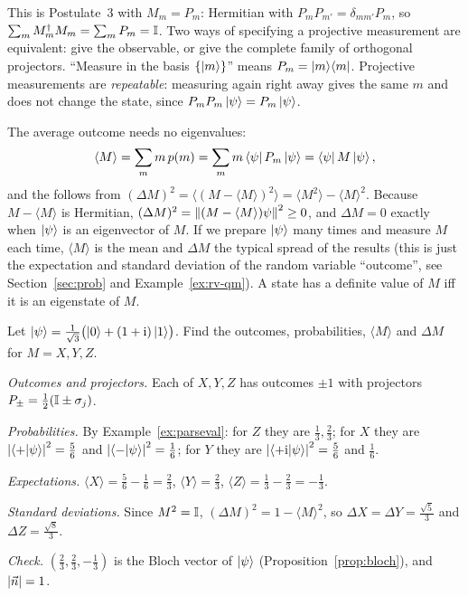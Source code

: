 This is Postulate~3 with $M_m=P_m$: Hermitian with $P_mP_{m'}=\delta_{mm'}P_m$, so $\sum_mM_m^\dagger M_m=\sum_mP_m=\mathbb{I}$. Two ways of specifying a projective measurement are equivalent: give the observable, or give the complete family of orthogonal projectors.
``Measure in the basis $\{\left|m\right\rangle\}$'' means $P_m=\left|m\right\rangle\!\left\langle m\right|$. Projective measurements are \emph{repeatable}: measuring again right away gives the same $m$ and does not change the state, since $P_mP_m\left|\psi\right\rangle=P_m\left|\psi\right\rangle$.

The average outcome needs no eigenvalues:
\[
  \langle M\rangle=\sum_mm\,p(m)=\sum_mm\left\langle\psi\right| P_m\left|\psi\right\rangle=\left\langle\psi\right| M\left|\psi\right\rangle,
\]
and the  follows from $(\Delta M)^2=\langle(M-\langle M\rangle)^2\rangle=\langle M^2\rangle-\langle M\rangle^2$. Because $M-\langle M\rangle$ is Hermitian, $(\Delta M)^2=\left\|(M-\langle M\rangle)\psi\right\|^2\ge0$, and $\Delta M=0$ exactly when $\left|\psi\right\rangle$ is an eigenvector of $M$.
If we prepare $\left|\psi\right\rangle$ many times and measure $M$ each time, $\langle M\rangle$ is the mean and $\Delta M$ the typical spread of the results (this is just the expectation and standard deviation of the random variable ``outcome'', see Section~\ref{sec:prob} and Example~\ref{ex:rv-qm}). A state has a definite value of $M$ iff it is an eigenstate of $M$.

\begin{example}\label{ex:meas-pauli}
  Let $\left|\psi\right\rangle=\frac1{\sqrt3}\bigl(\left|0\right\rangle+(1+\mathrm{i})\left|1\right\rangle\bigr)$. Find the outcomes, probabilities, $\langle M\rangle$ and $\Delta M$ for $M=X,Y,Z$.
\end{example}
\begin{solution}
  \begin{steps}
    \item \emph{Outcomes and projectors.} Each of $X,Y,Z$ has outcomes $\pm1$ with projectors $P_\pm=\tfrac12(\mathbb{I}\pm\sigma_j)$.
    \item \emph{Probabilities.} By Example~\ref{ex:parseval}: for $Z$ they are $\tfrac13,\tfrac23$; for $X$ they are $\left|\left\langle+\middle|\psi\right\rangle\right|^2=\tfrac56$ and $\left|\left\langle-\middle|\psi\right\rangle\right|^2=\tfrac16$; for $Y$ they are $\left|\left\langle+\mathrm{i}\middle|\psi\right\rangle\right|^2=\tfrac56$ and $\tfrac16$.
    \item \emph{Expectations.} $\langle X\rangle=\tfrac56-\tfrac16=\tfrac23$, $\langle Y\rangle=\tfrac23$, $\langle Z\rangle=\tfrac13-\tfrac23=-\tfrac13$.
    \item \emph{Standard deviations.} Since $M^2=\mathbb{I}$, $(\Delta M)^2=1-\langle M\rangle^2$, so $\Delta X=\Delta Y=\tfrac{\sqrt5}3$ and $\Delta Z=\tfrac{\sqrt8}3$.
    \item \emph{Check.} $(\tfrac23,\tfrac23,-\tfrac13)$ is the Bloch vector of $\left|\psi\right\rangle$ (Proposition~\ref{prop:bloch}), and $\left|\vec n\right|=1$.
  \end{steps}
\end{solution}

